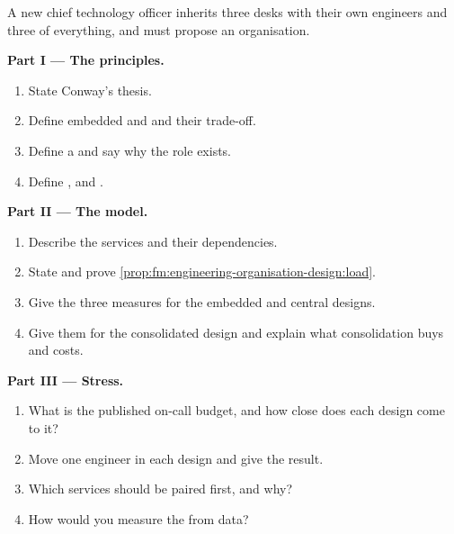 \begin{problem}\label{pb:fm:engineering-organisation-design:1}
A new chief technology officer inherits three desks with their own engineers and three of everything, and must propose an organisation.

\medskip\noindent\textbf{Part I --- The principles.}
\begin{enumerate}
\item State Conway's thesis.
\item Define embedded and  and their trade-off.
\item Define a  and say why the role exists.
\item Define ,  and .
\end{enumerate}

\medskip\noindent\textbf{Part II --- The model.}
\begin{enumerate}[resume]
\item Describe the services and their dependencies.
\item State and prove \cref{prop:fm:engineering-organisation-design:load}.
\item Give the three measures for the embedded and central designs.
\item Give them for the consolidated design and explain what consolidation buys and costs.
\end{enumerate}

\medskip\noindent\textbf{Part III --- Stress.}
\begin{enumerate}[resume]
\item What is the published on-call budget, and how close does each design come to it?
\item Move one engineer in each design and give the result.
\item Which services should be paired first, and why?
\item How would you measure the  from data?
\end{enumerate}


\end{problem}
